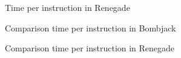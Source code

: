 \begin{figure}
	\caption{Time per instruction in Renegade}
\end{figure}
\begin{figure}
	\caption{Comparison time per instruction in Bombjack}
\end{figure}
\begin{figure}
	\caption{Comparison time per instruction in Renegade}
\end{figure}